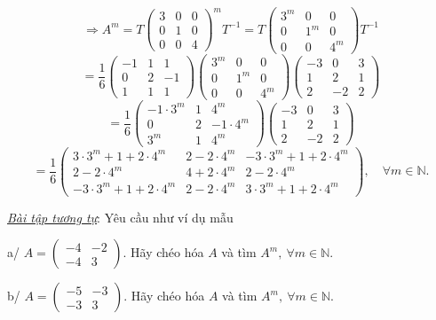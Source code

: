 \documentclass[12pt,a4paper]{article}
\newcommand{\N}{\mathbb{N}}
\begin{document}
\[
\Rightarrow A^m=T\begin{pmatrix}3&0&0\\0&1&0\\0&0&4\end{pmatrix}^{m}T^{-1}
=T\begin{pmatrix}3^m&0&0\\0&1^m&0\\0&0&4^m\end{pmatrix}T^{-1}
\]
\[
=\frac{1}{6}\begin{pmatrix}-1&1&1\\0&2&-1\\1&1&1\end{pmatrix}
\begin{pmatrix}3^m&0&0\\0&1^m&0\\0&0&4^m\end{pmatrix}
\begin{pmatrix}-3&0&3\\1&2&1\\2&-2&2\end{pmatrix}
\]
\[
=\frac{1}{6}\begin{pmatrix}-1\cdot 3^m & 1 & 4^m\\ 0 & 2 & -1\cdot4^m\\ 3^m & 1 & 4^m\end{pmatrix}
\begin{pmatrix}-3&0&3\\1&2&1\\2&-2&2\end{pmatrix}
\]
\[
=\frac{1}{6}\begin{pmatrix}
3\cdot3^m+1+2\cdot4^m & 2-2\cdot4^m & -3\cdot3^m+1+2\cdot4^m\\
2-2\cdot4^m & 4+2\cdot4^m & 2-2\cdot4^m\\
-3\cdot3^m+1+2\cdot4^m & 2-2\cdot4^m & 3\cdot3^m+1+2\cdot4^m
\end{pmatrix},\quad \forall m\in\N.
\]

\medskip
\noindent\textit{\underline{Bài tập tương tự}}: Yêu cầu như ví dụ mẫu

a/ $A=\begin{pmatrix}-4 & -2\\ -4 & 3\end{pmatrix}$. Hãy chéo hóa $A$ và tìm $A^m,\ \forall m\in\N$.

b/ $A=\begin{pmatrix}-5 & -3\\ -3 & 3\end{pmatrix}$. Hãy chéo hóa $A$ và tìm $A^m,\ \forall m\in\N$.
\end{document}
